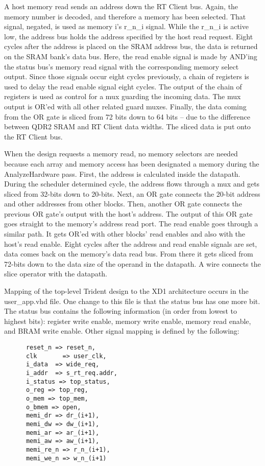 A host memory read sends an address down the RT Client bus.  Again,
the memory number is decoded, and therefore a memory has been
selected.  That signal, negated, is used as memory i's r\_n\_i signal.
While the r\_n\_i is active low, the address bus holds the address
specified by the host read request.  Eight cycles after the address is
placed on the SRAM address bus, the data is returned on the SRAM
bank's data bus.  Here, the read enable signal is made by AND'ing the
status bus's memory read signal with the corresponding memory select
output.  Since those signals occur eight cycles previously, a chain of
registers is used to delay the read enable signal eight cycles.  The
output of the chain of registers is used as control for a mux guarding
the incoming data.  The mux output is OR'ed with all other related
guard muxes.  Finally, the data coming from the OR gate is sliced from
72 bits down to 64 bits -- due to the difference between QDR2 SRAM and
RT Client data widths.  The sliced data is put onto the RT Client bus.

When the design requests a memory read, no memory selectors are needed
because each array and memory access has been designated a memory
during the AnalyzeHardware pass.  First, the address is calculated
inside the datapath.  During the scheduler determined cycle, the
address flows through a mux and gets sliced from 32-bits down to
20-bits.  Next, an OR gate connects the 20-bit address and other
addresses from other blocks.  Then, another OR gate connects the
previous OR gate's output with the host's address.  The output of this
OR gate goes straight to the memory's address read port.  The read
enable goes through a similar path.  It gets OR'ed with other blocks'
read enables and also with the host's read enable. Eight cycles after
the address and read enable signals are set, data comes back on the
memory's data read bus.  From there it gets sliced from 72-bits down
to the data size of the operand in the datapath.  A wire connects the
slice operator with the datapath.

Mapping of the top-level Trident design to the XD1 architecture occurs
in the user\_app.vhd file.  One change to this file is that the status
bus has one more bit. The status bus contains the following
information (in order from lowest to highest bits): register write
enable, memory write enable, memory read enable, and BRAM write
enable.  Other signal mapping is defined by the following:

\begin{verbatim}
      reset_n => reset_n,
      clk       => user_clk,
      i_data  => wide_req,
      i_addr  => s_rt_req.addr,
      i_status => top_status,
      o_reg => top_reg,
      o_mem => top_mem,
      o_bmem => open,
      memi_dr => dr_(i+1),
      memi_dw => dw_(i+1),
      memi_ar => ar_(i+1),
      memi_aw => aw_(i+1),
      memi_re_n => r_n_(i+1),
      memi_we_n => w_n_(i+1)
\end{verbatim}

